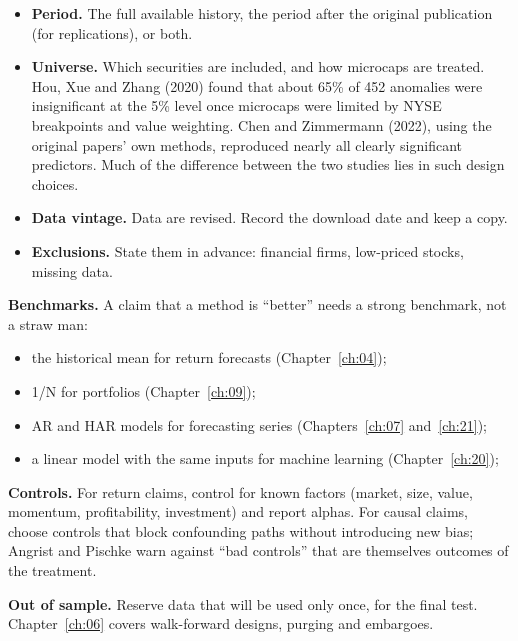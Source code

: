 \begin{itemize}
  \item \textbf{Period.} The full available history, the period after the original publication (for replications), or both.
  \item \textbf{Universe.} Which securities are included, and how microcaps are treated. Hou, Xue and Zhang (2020) found that about 65\% of 452 anomalies were insignificant at the 5\% level once microcaps were limited by NYSE breakpoints and value weighting. Chen and Zimmermann (2022), using the original papers' own methods, reproduced nearly all clearly significant predictors. Much of the difference between the two studies lies in such design choices.
  \item \textbf{Data vintage.} Data are revised. Record the download date and keep a copy.
  \item \textbf{Exclusions.} State them in advance: financial firms, low-priced stocks, missing data.
\end{itemize}

\textbf{Benchmarks.} A claim that a method is ``better'' needs a strong benchmark, not a straw man:

\begin{itemize}
  \item the historical mean for return forecasts (Chapter~\ref{ch:04});
  \item 1/N for portfolios (Chapter~\ref{ch:09});
  \item AR and HAR models for forecasting series (Chapters~\ref{ch:07} and~\ref{ch:21});
  \item a linear model with the same inputs for machine learning (Chapter~\ref{ch:20});
\end{itemize}

\textbf{Controls.} For return claims, control for known factors (market, size, value, momentum, profitability, investment) and report alphas. For causal claims, choose controls that block confounding paths without introducing new bias; Angrist and Pischke warn against ``bad controls'' that are themselves outcomes of the treatment.

\textbf{Out of sample.} Reserve data that will be used only once, for the final test. Chapter~\ref{ch:06} covers walk-forward designs, purging and embargoes.

